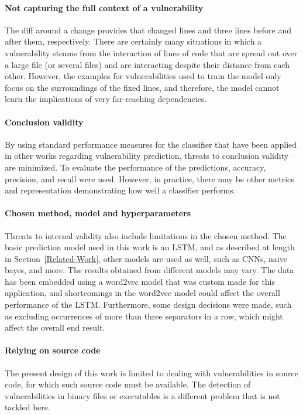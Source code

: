 \documentclass[
a4paper,
pagesize,
pdftex,
12pt,
twoside, %
BCOR=5mm, %
ngerman,
fleqn,
final,
]{scrartcl}
\begin{document}
	\paragraph{Not capturing the full context of a vulnerability}
	The diff around a change provides that changed lines and three lines before and after them, respectively. There are certainly many situations in which a vulnerability steams from the interaction of lines of code that are spread out over a large file (or several files) and are interacting despite their distance from each other. However, the examples for vulnerabilities used to train the model only focus on the surroundings of the fixed lines, and therefore, the model cannot learn the implications of very far-reaching dependencies.\\
	\paragraph{Conclusion validity}
	By using standard performance measures for the classifier that have been applied in other works regarding vulnerability prediction, threats to conclusion validity are minimized. To evaluate the performance of the predictions, accuracy, precision, and recall were used. However, in practice, there may be other metrics and representation demonstrating how well a classifier performs.
	\paragraph{Chosen method, model and hyperparameters}
	Threats to internal validity also include limitations in the chosen method. The basic prediction model used in this work is an LSTM, and as described at length in Section~\ref{Related-Work}, other models are used as well, such as CNNs, naive bayes, and more. The results obtained from different models may vary. The data has been embedded using a word2vec model that was custom made for this application, and shortcomings in the word2vec model could affect the overall performance of the LSTM. Furthermore, some design decisions were made, such as excluding occurrences of more than three separators in a row, which might affect the overall end result.  
	\paragraph{Relying on source code}
	The present design of this work is limited to dealing with vulnerabilities in source code, for which such source code must be available. The detection of vulnerabilities in binary files or executables is a different problem that is not tackled here. 
\end{document}
